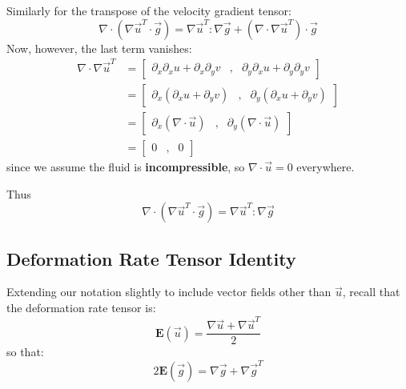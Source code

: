 \documentclass[12pt, a4paper, twoside, openright]{book}
\begin{document}
Similarly for the transpose of the velocity gradient tensor:
\begin{equation}
\nabla \cdot (\nabla \vec{u}^T \cdot \vec{g}) = 
\nabla \vec{u}^T:\nabla \vec{g} + (\nabla \cdot \nabla \vec{u}^T) \cdot \vec{g}
\end{equation}
Now, however, the last term vanishes:
\begin{align}
\nabla \cdot \nabla \vec{u}^T & =
\begin{bmatrix}
\partial_x \partial_x u + \partial_x \partial_y v &,&
 \partial_y \partial_x u + \partial_y \partial_y v
\end{bmatrix} \\
 & =
\begin{bmatrix}
\partial_x ( \partial_x u + \partial_y v ) &,&
\partial_y ( \partial_x u + \partial_y v )
\end{bmatrix} \\
 & = 
\begin{bmatrix}
\partial_x ( \nabla \cdot \vec{u}) &,&
\partial_y ( \nabla \cdot \vec{u})
\end{bmatrix} \\
 & = 
 \begin{bmatrix}
 0 &,& 0
 \end{bmatrix}
\end{align}
since we assume the fluid is \textbf{incompressible}, so $\nabla \cdot \vec{u} = 0$ everywhere.

Thus
\begin{equation}
\nabla \cdot (\nabla \vec{u}^T \cdot \vec{g}) = \nabla \vec{u}^T:\nabla \vec{g}
\end{equation}

\clearpage
\subsection{Deformation Rate Tensor Identity}

Extending our notation slightly to include vector fields other than $\vec{u}$, recall that the deformation rate tensor is:
\begin{equation}
\mathbf{E}(\vec{u}) = \frac{\nabla \vec{u} + \nabla \vec{u}^T }{2}
\end{equation}
so that:
\begin{equation}
2 \mathbf{E}(\vec{g}) = \nabla \vec{g} + \nabla \vec{g}^T
\end{equation}
\end{document}
